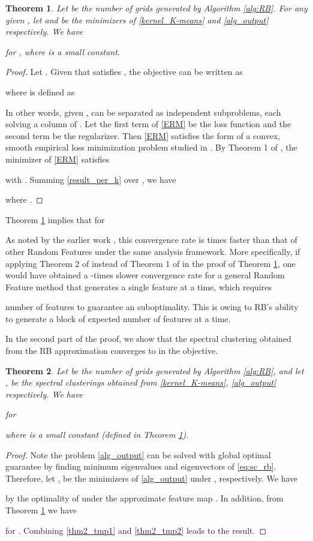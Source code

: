 \documentclass[sigconf]{acmart}
\newtheorem{theorem}{Theorem}
\newcommand{\1}{\boldsymbol{1}}
\newcommand{\0}{\boldsymbol{0}}
\begin{document}
\begin{theorem}\label{thm:RBconverge}
Let  be the number of grids generated by Algorithm \ref{alg:RB}. For any given , let  and  be the minimizers of \eqref{kernel_K-means} and \eqref{alg_output} respectively. We have

for , where  is a small constant.
\end{theorem}
\begin{proof}
Let . Given  that satisfies , the objective  can be written as

where  is defined as

In other words, given ,  can be separated as  independent subproblems, each solving a column of . Let the first term of \eqref{ERM} be the loss function and the second term be the regularizer. Then \eqref{ERM} satisfies the form of a convex, smooth empirical loss minimization problem studied in \cite{wu2016revisiting}. By Theorem 1 of \cite{wu2016revisiting}, the minimizer of \eqref{ERM} satisfies

with . Summing \eqref{result_per_k} over , we have

where .
\end{proof}

Theorem \ref{thm:RBconverge} implies that  for

As noted by the earlier work \cite{wu2016revisiting}, this convergence rate is  times faster than that of other Random Features under the same analysis framework. More specifically, if applying Theorem 2 of \cite{yen2014sparse} instead of Theorem 1 of \cite{wu2016revisiting} in the proof of Theorem \ref{thm:RBconverge}, one would have obtained a -times slower convergence rate for a general Random Feature method that generates a single feature at a time, which requires

number of features to guarantee an  suboptimality. This is owing to RB's ability to generate a block of  expected number of features at a time. 

In the second part of the proof, we show that the spectral clustering  obtained from the RB approximation converges to  in the objective.

\begin{theorem}\label{thm:SCconverge}
Let  be the number of grids generated by Algorithm \ref{alg:RB}, and let ,  be the spectral clusterings obtained from \eqref{kernel_K-means}, \eqref{alg_output} respectively. We have

for

where  is a small constant (defined in Theorem \ref{thm:RBconverge}).
\end{theorem}
\begin{proof}
Note the problem \eqref{alg_output} can be solved with global optimal guarantee by finding minimum eigenvalues and eigenvectors of \eqref{eq:sc_rb}. Therefore, let ,  be the minimizers of \eqref{alg_output} under ,  respectively. We have

by the optimality of  under the approximate feature map . In addition, from Theorem \ref{thm:RBconverge} we have

for . Combining \eqref{thm2_tmp1} and \eqref{thm2_tmp2} leads to the result.
\end{proof}
\end{document}

